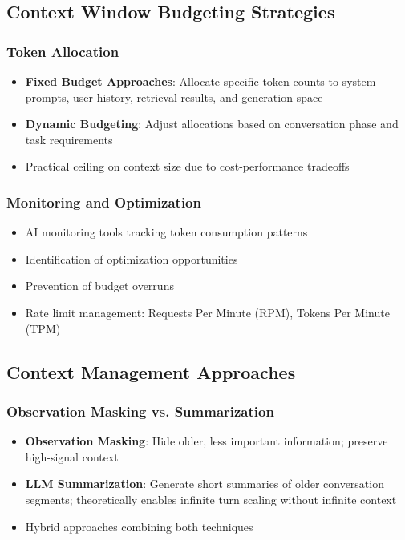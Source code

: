 \documentclass[11pt,letterpaper]{article}
\begin{document}
\subsection{Context Window Budgeting Strategies}

\subsubsection{Token Allocation}
\begin{itemize}[leftmargin=*]
    \item \textbf{Fixed Budget Approaches}: Allocate specific token counts to system prompts, user history, retrieval results, and generation space
    \item \textbf{Dynamic Budgeting}: Adjust allocations based on conversation phase and task requirements
    \item Practical ceiling on context size due to cost-performance tradeoffs
\end{itemize}

\subsubsection{Monitoring and Optimization}
\begin{itemize}[leftmargin=*]
    \item AI monitoring tools tracking token consumption patterns
    \item Identification of optimization opportunities
    \item Prevention of budget overruns
    \item Rate limit management: Requests Per Minute (RPM), Tokens Per Minute (TPM)
\end{itemize}

\subsection{Context Management Approaches}

\subsubsection{Observation Masking vs. Summarization}
\begin{itemize}[leftmargin=*]
    \item \textbf{Observation Masking}: Hide older, less important information; preserve high-signal context
    \item \textbf{LLM Summarization}: Generate short summaries of older conversation segments; theoretically enables infinite turn scaling without infinite context
    \item Hybrid approaches combining both techniques
\end{itemize}
\end{document}
